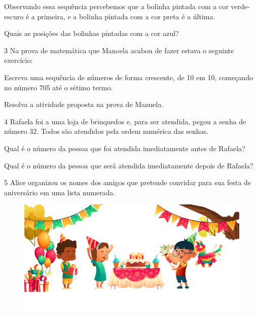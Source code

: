 Observando essa sequência percebemos que a bolinha pintada com a cor
verde-escuro é a primeira, e a bolinha pintada com a cor preta é a
última.

Quais as posições das bolinhas pintadas com a cor azul?



\num{3} Na prova de matemática que Manoela acabou de fazer estava o seguinte exercício:

\begin{myquote}
Escreva uma sequência de números de forma crescente, de 10 em 10, começando no número 705 até o sétimo termo.


\end{myquote}

Resolva a atividade proposta na prova de Manuela.



\num{4} Rafaela foi a uma loja de brinquedos e, para ser atendida, pegou a senha de
número 32. Todos são atendidos pela ordem numérica das senhas.



\begin{escolha}
\item Qual é o número da pessoa que foi atendida imediatamente antes de Rafaela?\\

\item Qual é o número da pessoa que será atendida imediatamente depois de Rafaela?\\
\end{escolha}

\num{5} Alice organizou os nomes dos amigos que pretende convidar para sua
festa de aniversário em uma lista numerada.

\begin{figure}[htpb!]
\includegraphics[width=\textwidth]{./media/image28a.png}
\end{figure}

